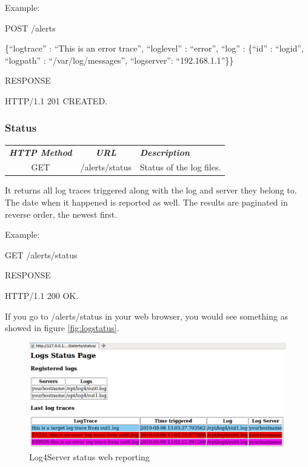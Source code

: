 \noindent
Example:

\begin{codeexample}

POST /alerts

 \{``logtrace'' : ``This is an error trace'', 
   ``loglevel'' : ``error'',
   ``log'' : \{``id'' : ``logid'', ``logpath'' : ``/var/log/messages'', ``logserver'': 
``192.168.1.1''\}\} 

RESPONSE

HTTP/1.1 201 CREATED.
\end{codeexample}

\subsubsection{Status}

\begin{flushleft}
 \begin{tabular}{|c|c|l|}
 \hline 
 \rowcolor{cyan} {\color{white} \textit{\textbf{HTTP Method}}} &  {\color{white} 
  \textit{\textbf{URL}}}  & {\color{white} 
 \textit{\textbf{Description}}}\\
 GET & /alerts/status & Status of the log files.\\
 \hline
\end{tabular}
\end{flushleft}
It returns all log traces triggered along with the log and server they belong to. The 
date when it happened is reported as well. The results are paginated in reverse
order, the newest first.

\noindent
Example:

\begin{codeexample}

GET /alerts/status

RESPONSE

HTTP/1.1 200 OK.
\end{codeexample}


\noindent
If you go to /alerts/status in your web browser, you would see something as showed in figure 
\autoref{fig:logstatus}.

\begin{figure}[ht]
\includegraphics[scale=0.50]{logstatus.png}
\caption{Log4Server status web reporting}\label{fig:logstatus}
\end{figure}

